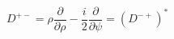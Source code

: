 \begin{equation}
D^{+-}= \rho \frac{\partial}{\partial \rho} -\frac{i}{2} \frac{\partial}{\partial \psi} =
(D^{-+})^{\ast}
\end{equation}

